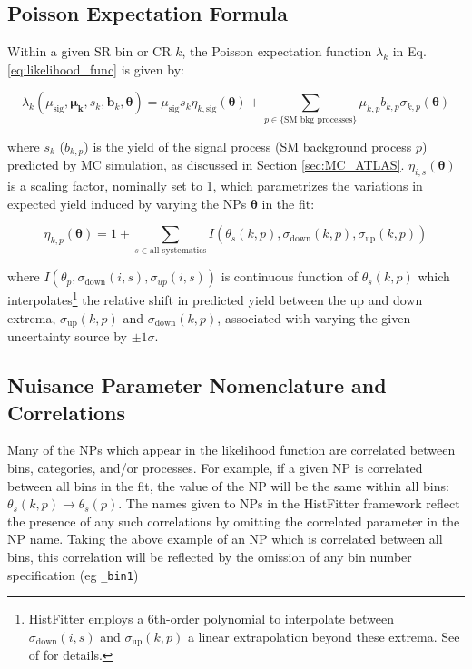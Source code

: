 \subsection{Poisson Expectation Formula}
\label{sec:poisson_exp}

Within a given SR bin or CR \(k\), the Poisson expectation function \(\lambda_k\) in Eq. \ref{eq:likelihood_func} is given by:
    
\begin{equation}
\label{eq:lambda}
        \lambda_k(\mu_\text{sig}, \boldsymbol{\mu_k}, s_k, \boldsymbol{b}_k, \boldsymbol{\theta}) = \mu_\text{sig}s_k\eta_{k, \text{sig}}(\boldsymbol{\theta}) + \sum\limits_{p\in{\text{\{SM bkg processes\}}}} \mu_{k,p} b_{k,p}\sigma_{k,p}(\boldsymbol{\theta})
\end{equation}
    
\noindent where \(s_k\) (\(b_{k,p}\)) is the yield of the signal process (SM background process \(p\)) predicted by MC simulation, as discussed in Section \ref{sec:MC_ATLAS}. \(\eta_{i,s}(\boldsymbol{\theta})\) is a scaling factor, nominally set to 1, which parametrizes the variations in expected yield induced by varying the NPs \(\boldsymbol{\theta}\) in the fit:

        \begin{equation}
            \label{eq:sigma}
            \eta_{k,p}(\boldsymbol{\theta}) = 1 + \sum_{s\in\text{all systematics}}I(\theta_s(k,p), \sigma_\text{down}(k,p), \sigma_\text{up}(k,p))
        \end{equation}

        where \(I(\theta_p, \sigma_\text{down}(i,s), \sigma_{up}(i,s))\) is continuous function of \(\theta_s(k,p)\) which interpolates\footnote{HistFitter employs a 6th-order polynomial to interpolate between  \(\sigma_\text{down}(i,s)\) and \(\sigma_\text{up}(k,p)\) a linear extrapolation beyond these extrema. See  of  for details.} the relative shift in predicted yield between the up and down extrema, \(\sigma_\text{up}(k,p)\) and \(\sigma_\text{down}(k,p)\), associated with varying the given uncertainty source by \(\pm1\sigma\). 

\subsection{Nuisance Parameter Nomenclature and Correlations}

Many of the NPs which appear in the likelihood function are correlated between bins, categories, and/or processes. For example, if a given NP is correlated between all bins in the fit, the value of the NP will be the same within all bins: \(\theta_s(k, p) \rightarrow \theta_s(p)\). The names given to NPs in the HistFitter framework reflect the presence of any such correlations by omitting the correlated parameter in the NP name. Taking the above example of an NP which is correlated between all bins, this correlation will be reflected by the omission of any bin number specification (eg \verb|_bin1|) 

